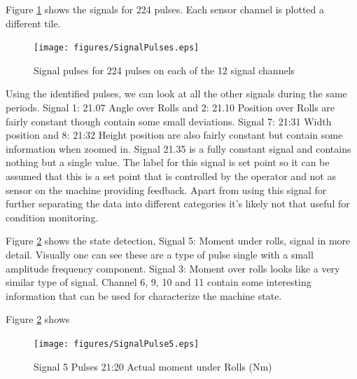 \documentclass{article}
\begin{document}
Figure \ref{fig:SignalPulses} shows the signals for 224 pulses. Each sensor channel is plotted a different tile. 
\begin{figure}[H]
    \centering
    \texttt{[image: figures/SignalPulses.eps]}
    \caption{Signal pulses for 224 pulses on each of the 12 signal channels}
    \label{fig:SignalPulses}
\end{figure}

Using the identified pulses, we can look at all the other signals during the same periods. Signal 1: 21.07 Angle over Rolls and 2: 21.10 Position over Rolls are fairly constant though contain some small deviations. Signal 7: 21:31 Width position and  8: 21:32 Height position are also fairly constant but contain some information when zoomed in. Signal 21.35 is a fully constant signal and contains nothing but a single value. The label for this signal is set point so it can be assumed that this is a set point that is controlled by the operator and not as sensor on the machine providing feedback. Apart from using this signal for further separating the data into different categories it's likely not that useful for condition monitoring.

Figure \ref{fig:SignalPulse5} shows the state detection, Signal 5: Moment under rolls, signal in more detail. Visually one can see these are a type of pulse single with a small amplitude frequency component. Signal 3: Moment over rolls looks like a very similar type of signal. Channel 6, 9, 10 and 11 contain some interesting information that can be used for characterize the machine state.

 
 


Figure \ref{fig:SignalPulse5} shows 
\begin{figure}[H]
    \centering
    \texttt{[image: figures/SignalPulse5.eps]}
    \caption{Signal 5 Pulses 21:20 Actual moment under Rolls (Nm)}
    \label{fig:SignalPulse5}
\end{figure}
\end{document}
